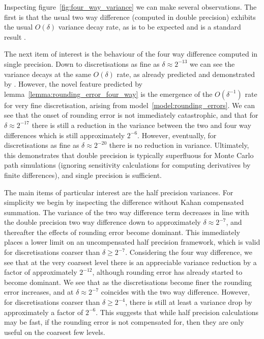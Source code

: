 \documentclass[manuscript,review]{acmart}
\begin{document}
Inspecting figure~\ref{fig:four_way_variance} we can make several observations. The first is that the usual two way difference (computed in double precision) exhibits the usual $ O(\delta) $ variance decay rate, as is to be expected and is a standard result \citep{kloeden1999numerical,glasserman2013monte}. 

The next item of interest is the behaviour of the four way difference computed in single precision. Down to discretisations as fine as $ \delta \approx 2^{-13} $ we can see the variance decays at the same $ O(\delta) $ rate, as already predicted and demonstrated by \citet[4.1]{giles2020approximating}. However, the novel feature predicted by lemma~\ref{lemma:rounding_error_four_way} is the emergence of the $ O(\delta^{-1}) $ rate  for very fine discretisation, arising from model~\ref{model:rounding_errors}. We can see that the onset of rounding error is not immediately catastrophic, and that for $ \delta \approx 2^{-17} $ there is still a reduction in the variance between the two and four way differences which is still approximately $ 2^{-6} $. However, eventually, for discretisations as fine as $ \delta \approx 2^{-20} $ there is no reduction in variance. Ultimately, this demonstrates that double precision is typically superfluous for Monte Carlo path simulations (ignoring sensitivity calculations for computing derivatives by finite differences), and single precision is sufficient. 

The main items of particular interest are the half precision variances. For simplicity we begin by inspecting the difference without Kahan compensated summation. The variance of the two way difference term decreases in line with the double precision two way difference down to approximately $ \delta \approx 2^{-7} $, and thereafter the effects of rounding error become dominant. This immediately places a lower limit on an uncompensated half precision framework, which is valid for discretisations coarser than $ \delta \geq 2^{-7} $. Considering the four way difference, we see that at the very coarsest level there is an appreciable variance reduction by a factor of approximately $ 2^{-12} $, although rounding error has already started to become dominant. We see that as the discretisations become finer the rounding error increases, and at $ \delta \approx 2^{-7} $ coincides with the two way difference. However, for discretisations coarser than $ \delta \geq 2^{-4} $, there is still at least a variance drop by approximately a factor of $ 2^{-6} $. This suggests that while half precision calculations may be fast, if the rounding error is not compensated for, then they are only useful on the coarsest few levels. 
\end{document}
